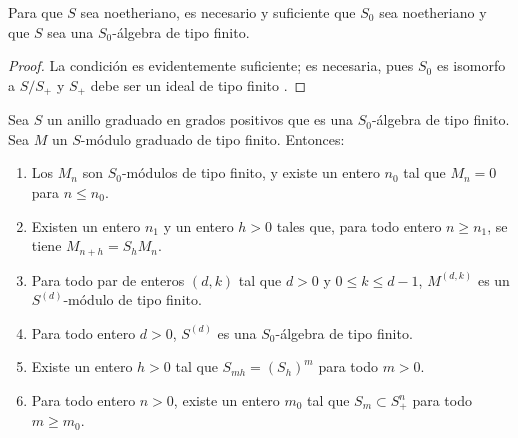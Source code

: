 \documentclass[oneside,10pt]{amsart}
\renewcommand{\leq}{\leqslant}
\renewcommand{\geq}{\geqslant}
\let\EGAOriginalLabel\label
\renewcommand{\label}[1]{\phantomsection\EGAOriginalLabel{#1}}
\begin{document}
\begin{corollary}[2.1.5]
\label{II.2.1.5}
Para que $S$ sea noetheriano, es necesario y suficiente que $S_0$ sea noetheriano y que $S$ sea una $S_0$-álgebra de tipo finito.
\end{corollary}

\begin{proof}
La condición es evidentemente suficiente; es necesaria, pues $S_0$ es isomorfo a $S/S_+$ y $S_+$ debe ser un ideal de tipo finito .
\end{proof}

\begin{lemma}[2.1.6]
\label{II.2.1.6}
Sea $S$ un anillo graduado en grados positivos que es una $S_0$-álgebra de tipo finito.
Sea $M$ un $S$-módulo graduado de tipo finito.
Entonces:
\begin{enumerate}
  \item[{\rm(i)}] Los $M_n$ son $S_0$-módulos de tipo finito, y existe un entero $n_0$ tal que $M_n=0$ para $n\leq n_0$.
  \item[{\rm(ii)}] Existen un entero $n_1$ y un entero $h>0$ tales que, para todo entero $n\geq n_1$, se tiene $M_{n+h}=S_hM_n$.
  \item[{\rm(iii)}] Para todo par de enteros $(d,k)$ tal que $d>0$ y $0\leq k\leq d-1$, $M^{(d,k)}$ es un $S^{(d)}$-módulo de tipo finito.
  \item[{\rm(iv)}] Para todo entero $d>0$, $S^{(d)}$ es una $S_0$-álgebra de tipo finito.
  \item[{\rm(v)}] Existe un entero $h>0$ tal que $S_{mh}=(S_h)^m$ para todo $m>0$.
  \item[{\rm(vi)}] Para todo entero $n>0$, existe un entero $m_0$ tal que $S_m\subset S_+^n$ para todo $m\geq m_0$.
\end{enumerate}
\end{lemma}
\end{document}
